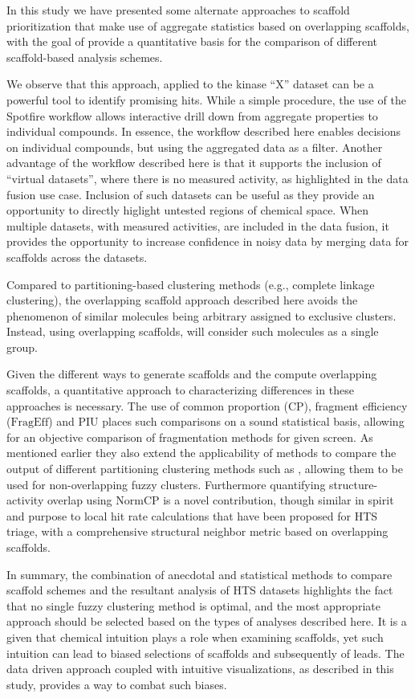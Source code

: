 \documentclass[journal=jacsat,manuscript=article]{achemso}
\begin{document}
In this study we have presented some alternate approaches to scaffold
prioritization that make use of aggregate statistics based on
overlapping scaffolds, with the goal of provide a quantitative basis
for the comparison of different scaffold-based analysis schemes. 

We observe that this approach, applied to the kinase ``X'' dataset can
be a powerful tool to identify promising hits. While a simple
procedure, the use of the Spotfire workflow allows interactive drill
down from aggregate properties to individual compounds. In essence,
the workflow described here enables decisions on individual compounds,
but using the aggregated data as a filter. Another advantage of the
workflow described here is that it supports the inclusion of ``virtual
datasets'', where there is no measured activity, as highlighted in the
data fusion use case.  Inclusion of such datasets can be useful as
they provide an opportunity to directly higlight untested regions of
chemical space. When multiple datasets, with measured activities, are
included in the data fusion, it provides the opportunity to increase
confidence in noisy data by merging data for scaffolds across the
datasets.

Compared to partitioning-based clustering methods (e.g., complete
linkage clustering), the overlapping scaffold approach described here
avoids the phenomenon of similar molecules being arbitrary assigned to
exclusive clusters.  Instead, using overlapping scaffolds, will
consider such molecules as a single group.

Given the different ways to generate scaffolds and the compute
overlapping scaffolds, a quantitative approach to characterizing
differences in these approaches is necessary. The use of common
proportion ($\textrm{CP}$), fragment efficiency ($\textrm{FragEff}$)
and PIU places such comparisons on a sound statistical basis, allowing
for an objective comparison of fragmentation methods for given
screen. As mentioned earlier they also extend the applicability of
methods to compare the output of different partitioning clustering
methods such as \citeauthor{Torres2009}, allowing them to be used for
non-overlapping fuzzy clusters. Furthermore quantifying
structure-activity overlap using $\textrm{NormCP}$ is a novel
contribution, though similar in spirit and purpose to local hit rate
calculations that have been proposed for HTS triage\cite{Posner2009},
with a comprehensive structural neighbor metric based on overlapping
scaffolds.

In summary, the combination of anecdotal and statistical methods to
compare scaffold schemes and the resultant analysis of HTS datasets
highlights the fact that no single fuzzy clustering method is optimal,
and the most appropriate approach should be selected based on the
types of analyses described here. It is a given that chemical
intuition plays a role when examining scaffolds, yet such intuition
can lead to biased selections of scaffolds and subsequently of
leads. The data driven approach coupled with intuitive visualizations,
as described in this study, provides a way to combat such biases.
\end{document}
